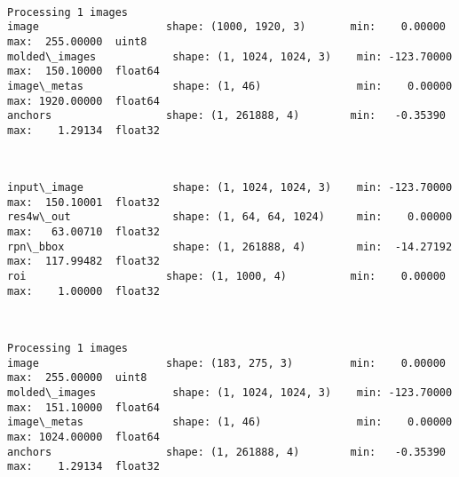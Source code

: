 \documentclass[11pt]{article}
\begin{document}
    \begin{center}
    \end{center}
    { \hspace*{\fill} \\}
    
    \begin{Verbatim}[commandchars=\\\{\}]
Processing 1 images
image                    shape: (1000, 1920, 3)       min:    0.00000  max:  255.00000  uint8
molded\_images            shape: (1, 1024, 1024, 3)    min: -123.70000  max:  150.10000  float64
image\_metas              shape: (1, 46)               min:    0.00000  max: 1920.00000  float64
anchors                  shape: (1, 261888, 4)        min:   -0.35390  max:    1.29134  float32

    \end{Verbatim}

    \begin{center}
    \end{center}
    { \hspace*{\fill} \\}
    
    \begin{Verbatim}[commandchars=\\\{\}]
input\_image              shape: (1, 1024, 1024, 3)    min: -123.70000  max:  150.10001  float32
res4w\_out                shape: (1, 64, 64, 1024)     min:    0.00000  max:   63.00710  float32
rpn\_bbox                 shape: (1, 261888, 4)        min:  -14.27192  max:  117.99482  float32
roi                      shape: (1, 1000, 4)          min:    0.00000  max:    1.00000  float32

    \end{Verbatim}

    \begin{center}
    \end{center}
    { \hspace*{\fill} \\}
    
    \begin{Verbatim}[commandchars=\\\{\}]
Processing 1 images
image                    shape: (183, 275, 3)         min:    0.00000  max:  255.00000  uint8
molded\_images            shape: (1, 1024, 1024, 3)    min: -123.70000  max:  151.10000  float64
image\_metas              shape: (1, 46)               min:    0.00000  max: 1024.00000  float64
anchors                  shape: (1, 261888, 4)        min:   -0.35390  max:    1.29134  float32

    \end{Verbatim}
\end{document}
